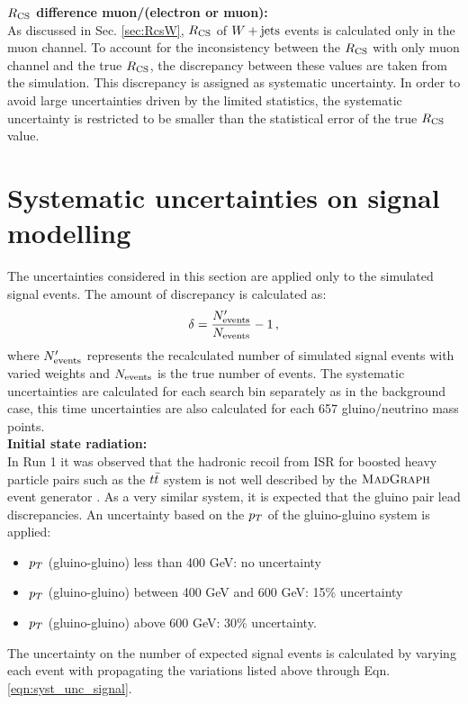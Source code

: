 \textbf{$R_{\rm CS}$ difference muon/(electron or muon):}\\
As discussed in Sec. \ref{sec:RcsW}, $R_{\rm CS}$ of $W+\textrm{jets}$ events is calculated only in the muon channel. To account for the inconsistency between the $R_{\rm CS}$ with only muon channel and the true $R_{\rm CS}$, the discrepancy between these values are taken from the simulation. This discrepancy is assigned as systematic uncertainty. In order to avoid large uncertainties driven by the limited statistics, the systematic uncertainty is restricted to be smaller than the statistical error of the true $R_{\rm CS}$ value. 
\section{Systematic uncertainties on signal modelling}
The uncertainties considered in this section are applied only to the simulated signal events.  The amount of discrepancy is calculated as:
\begin{equation}
\label{eqn:syst_unc_signal}
\delta = \frac{N'_{\rm events}}{N_{\rm events}}-1\, ,
\end{equation}
where $N'_{\rm events}$ represents the recalculated number of simulated signal events with varied weights and $N_{\rm events}$ is the true number of events. The systematic uncertainties are calculated for each search bin separately as in the background case, this time uncertainties are also calculated for each 657 gluino/neutrino mass points. \\
\textbf{Initial state radiation:}\\
In Run 1 it was observed that the hadronic recoil from ISR for boosted heavy particle pairs such as the $t\bar{t}$ system is not well described by the $\textsc{MadGraph}$ event generator \cite{ISR}. As a very similar system, it is expected that the gluino pair lead discrepancies.
An uncertainty based on the $p_T$ of the gluino-gluino system is applied:
\begin{itemize}
\item $p_T$ (gluino-gluino) less than 400 GeV: no uncertainty
\item $p_T$ (gluino-gluino) between 400 GeV and 600 GeV: 15\% uncertainty
\item $p_T$ (gluino-gluino) above 600 GeV: 30\% uncertainty.
\end{itemize}
The uncertainty on the number of expected signal events is calculated by varying each event with propagating the variations listed above through Eqn. \ref{eqn:syst_unc_signal}.\\
